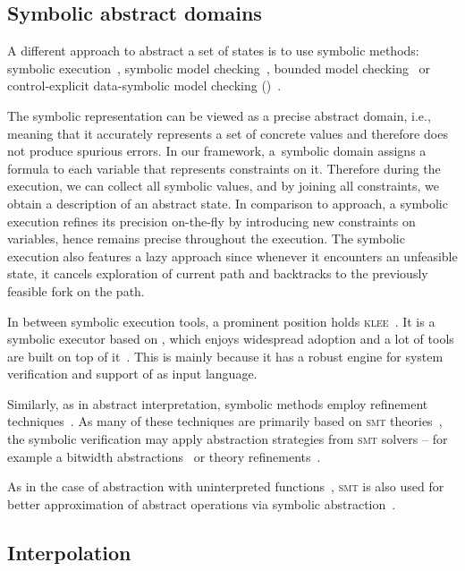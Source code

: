 \subsection{Symbolic abstract domains}

A different approach to abstract a set of states is to use symbolic methods:
symbolic execution~\cite{King76, Cadar2013symbolic, Baldoni2018survey}, symbolic model
checking~\cite{Clarke96, McMillan93, Cimatti20}, bounded model
checking~\cite{Biere2003bounded} or control-explicit data-symbolic model
checking (\ceds)~\cite{Mrazek2016}.

The symbolic representation can be viewed as a precise abstract domain, i.e.,
meaning that it accurately represents a set of concrete values and therefore
does not produce spurious errors. In our framework, a~symbolic domain assigns
a formula to each variable that represents constraints on it. Therefore during
the execution, we can collect all symbolic values, and by joining all
constraints, we obtain a description of an abstract state. In comparison to
\cegar approach, a symbolic execution refines its precision on-the-fly by
introducing new constraints on variables, hence remains precise throughout the
execution. The symbolic execution also features a lazy approach since whenever
it encounters an unfeasible state, it cancels exploration of current path
and backtracks to the previously feasible fork on the path.

In between symbolic execution tools, a prominent position holds
\textsc{klee}~\cite{Cadar2008klee}. It is a symbolic executor based on \llvm,
which enjoys widespread adoption and a lot of tools are built on top of
it~\cite{Beyer2018Klee, Chalupa2018, Chen2018, Menezes2018}. This is mainly because it
has a robust engine for system verification and support of \llvm as input
language.

Similarly, as in abstract interpretation, symbolic methods employ refinement
techniques~\cite{Beyer2016}. As many of these techniques are primarily based on
\textsc{smt} theories~\cite{Beyer2018}, the symbolic verification may apply abstraction
strategies from \textsc{smt} solvers -- for example a bitwidth
abstractions~\cite{Jonavs2018} or theory refinements~\cite{Hyvarinen2017}.

As in the case of abstraction with uninterpreted functions~\cite{Gange2016}, \textsc{smt} is also used for better approximation of abstract operations via symbolic abstraction~\cite{Thakur2012}.

\subsection{Interpolation}
\label{sec:interpolation}

